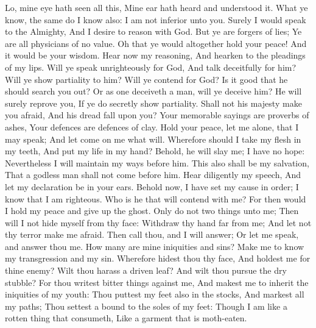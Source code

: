 Lo, mine eye hath seen all this, Mine ear hath heard and understood it.  What ye know, the same do I know also: I am not inferior unto you.  Surely I would speak to the Almighty, And I desire to reason with God.  But ye are forgers of lies; Ye are all physicians of no value.  Oh that ye would altogether hold your peace! And it would be your wisdom.  Hear now my reasoning, And hearken to the pleadings of my lips.  Will ye speak unrighteously for God, And talk deceitfully for him?  Will ye show partiality to him? Will ye contend for God?  Is it good that he should search you out? Or as one deceiveth a man, will ye deceive him?  He will surely reprove you, If ye do secretly show partiality.  Shall not his majesty make you afraid, And his dread fall upon you?  Your memorable sayings are proverbs of ashes, Your defences are defences of clay.  Hold your peace, let me alone, that I may speak; And let come on me what will.  Wherefore should I take my flesh in my teeth, And put my life in my hand?  Behold, he will slay me; I have no hope: Nevertheless I will maintain my ways before him.  This also shall be my salvation, That a godless man shall not come before him.  Hear diligently my speech, And let my declaration be in your ears.  Behold now, I have set my cause in order; I know that I am righteous.  Who is he that will contend with me? For then would I hold my peace and give up the ghost.  Only do not two things unto me; Then will I not hide myself from thy face:  Withdraw thy hand far from me; And let not thy terror make me afraid.  Then call thou, and I will answer; Or let me speak, and answer thou me.  How many are mine iniquities and sins? Make me to know my transgression and my sin.  Wherefore hidest thou thy face, And holdest me for thine enemy?  Wilt thou harass a driven leaf? And wilt thou pursue the dry stubble?  For thou writest bitter things against me, And makest me to inherit the iniquities of my youth:  Thou puttest my feet also in the stocks, And markest all my paths; Thou settest a bound to the soles of my feet:  Though I am like a rotten thing that consumeth, Like a garment that is moth-eaten. 

